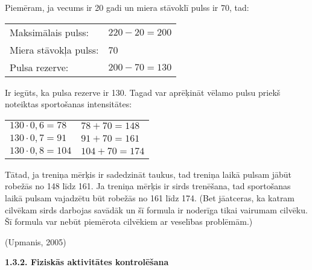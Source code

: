 \documentclass[12pt]{article}
\begin{document}
Piemēram, ja vecums ir 20 gadi un miera stāvoklī pulss ir 70, tad:\par
\vspace{4pt}
\begin{tabular}{l|l}
    Maksimālais pulss: & $220-20=200$ \\
    Miera stāvokļa pulss: & 70\\
    Pulsa rezerve: & $200-70=130$\\
\end{tabular}\par
\vspace{4pt}
Ir iegūts, ka pulsa rezerve ir 130. Tagad var aprēķināt vēlamo pulsu priekš noteiktas sportošanas intensitātes:\par
\vspace{4pt}
\begin{tabular}{l|l}
    $130\cdot 0,6=78$ & $78+70=148$ \\
    $130\cdot 0,7=91$ & $91+70=161$ \\
    $130\cdot 0,8=104$ & $104+70=174$
\end{tabular}\par
\vspace{4pt}
Tātad, ja treniņa mērķis ir sadedzināt taukus, tad treniņa laikā pulsam jābūt robežās no 148 līdz 161. Ja treniņa mērķis ir sirds trenēšana, tad sportošanas laikā pulsam vajadzētu būt robežās no 161 līdz 174. (Bet jāatceras, ka katram cilvēkam sirds darbojas savādāk un šī formula ir noderīga tikai vairumam cilvēku. Šī formula var nebūt piemērota cilvēkiem ar veselības problēmām.)\par
(Upmanis, 2005)

\begin{center}
\fontsize{14}{}\selectfont\textbf{1.3.2. Fiziskās aktivitātes kontrolēšana}
\end{center}
\end{document}
